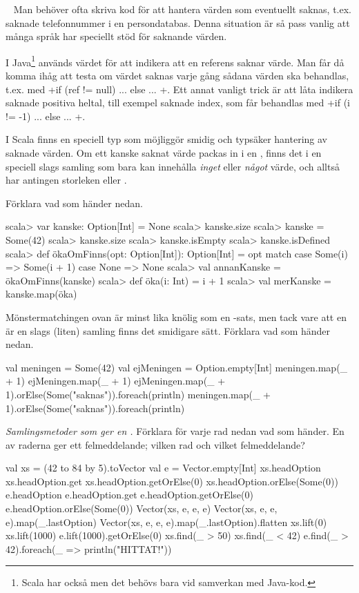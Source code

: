 \QUESTEND





\QUESTBEGIN

\Task  \what~  Man behöver ofta skriva kod för att hantera värden som eventuellt saknas, t.ex. saknade telefonnummer i en persondatabas. Denna situation är så pass vanlig att många språk har speciellt stöd för saknande värden.

I Java\footnote{Scala har också  men det behövs bara vid samverkan med Java-kod.} används värdet  för att indikera att en referens saknar värde. Man får då komma ihåg att testa om värdet saknas varje gång sådana värden ska behandlas, t.ex. med \code+if (ref != null) { ...} else { ... }+. Ett annat vanligt trick är att låta  indikera saknade positiva heltal, till exempel saknade index, som får behandlas med \code+if (i != -1) { ...} else { ... }+.

I Scala finns en speciell typ  som möjliggör smidig och typsäker hantering av saknade värden. Om ett kanske saknat värde packas in i en  , finns det i en speciell slags samling som bara kan innehålla \emph{inget} eller \emph{något} värde, och alltså har antingen storleken  eller .

\Subtask Förklara vad som händer nedan.
\begin{REPL}
scala> var kanske: Option[Int] = None
scala> kanske.size
scala> kanske = Some(42)
scala> kanske.size
scala> kanske.isEmpty
scala> kanske.isDefined
scala> def ökaOmFinns(opt: Option[Int]): Option[Int] = opt match
         case Some(i) => Some(i + 1)
         case None    => None
scala> val annanKanske = ökaOmFinns(kanske)
scala> def öka(i: Int) = i + 1
scala> val merKanske = kanske.map(öka)
\end{REPL}

\Subtask Mönstermatchingen ovan är minst lika knölig som en -sats, men tack vare att en  är en slags (liten) samling finns det smidigare sätt. Förklara vad som händer nedan.
\begin{REPL}
val meningen = Some(42)
val ejMeningen = Option.empty[Int]
meningen.map(_ + 1)
ejMeningen.map(_ + 1)
ejMeningen.map(_ + 1).orElse(Some("saknas")).foreach(println)
meningen.map(_ + 1).orElse(Some("saknas")).foreach(println)
\end{REPL}

\Subtask \emph{Samlingsmetoder som ger en .} Förklara för varje rad nedan vad som händer. En av raderna ger ett felmeddelande; vilken rad och vilket felmeddelande?
\begin{REPL}
val xs = (42 to 84 by 5).toVector
val e = Vector.empty[Int]
xs.headOption
xs.headOption.get
xs.headOption.getOrElse(0)
xs.headOption.orElse(Some(0))
e.headOption
e.headOption.get
e.headOption.getOrElse(0)
e.headOption.orElse(Some(0))
Vector(xs, e, e, e)
Vector(xs, e, e, e).map(_.lastOption)
Vector(xs, e, e, e).map(_.lastOption).flatten
xs.lift(0)
xs.lift(1000)
e.lift(1000).getOrElse(0)
xs.find(_ > 50)
xs.find(_ < 42)
e.find(_ > 42).foreach(_ => println("HITTAT!"))
\end{REPL}

